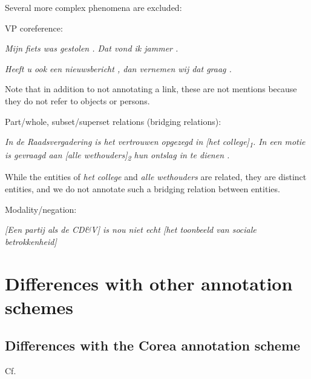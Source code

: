 Several more complex phenomena are excluded:
\begin{itemize*}
\item VP coreference:

  \emph{\n{[}Mijn fiets was gestolen\n{]} . \n{[}Dat\n{]} vond ik
  jammer .}
  
  \emph{\n{[}Heeft u ook een nieuwsbericht\n{]} , dan vernemen wij
  \n{[}dat\n{]} graag .}
  
  Note that in addition to not annotating a link, these are not mentions because they do not refer to objects or persons.

\item Part/whole, subset/superset relations (bridging relations):

  \emph{In de Raadsvergadering is het vertrouwen opgezegd in {[}het
  college{]}\textsubscript{1}. In een motie is gevraagd aan {[}alle
  wethouders{]}\textsubscript{2} hun ontslag in te dienen .}

  While the entities of \emph{het college} and \emph{alle wethouders} are related, they are distinct entities, and we do not annotate such a bridging relation between entities.
  
\item Modality/negation:

  \emph{{[}Een partij als de CD\&V{]} is nou niet echt {[}het toonbeeld
  van sociale betrokkenheid{]}}

\end{itemize*}


\section{Differences with other annotation schemes}
\subsection{Differences with the Corea annotation scheme}
Cf. \citet{bouma2007corea}

